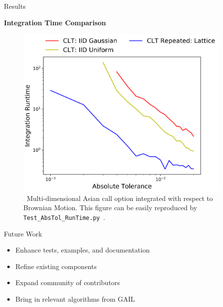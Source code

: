 \documentclass[final]{beamer}
\newcommand{\bfCenter}[1]{\centerline{\textbf{#1}}}
\newlength{\sepwid}
\newlength{\onecolwid}
\begin{document}
\begin{frame}[t]
\begin{columns}[t]
\begin{column}{\sepwid}\end{column}
\begin{column}{\onecolwid}\vspace{-.3in}
\begin{block}{Results}
    \bfCenter{Integration Time Comparison}
    \begin{figure}
        \includegraphics[width=1.05\textwidth]{Images/AbsTol_Runtime_LinePlot.png}
        \vspace{-1ex}
        \caption{\ Multi-dimensional Asian call option integrated with respect to  Brownian Motion. This figure can be easily reproduced by \texttt{Test\_AbsTol\_RunTime.py}~\cite{HicEtal19}.}
    \end{figure}
\end{block}

\vspace{-.8in}
\begin{block}{Future Work}
    \begin{itemize}
        \item Enhance tests, examples, and documentation
        \item Refine existing components
        \item Expand community of contributors
        \item Bring in relevant algorithms from GAIL~\cite{ChoEtal19}
    \end{itemize}
\end{block}


\end{column}
\end{columns}
\end{frame}
\end{document}
